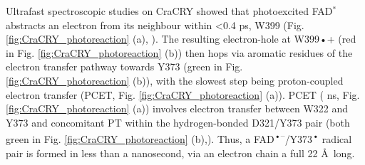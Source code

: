Ultrafast spectroscopic studies on CraCRY showed that photoexcited FAD\(^\ast\) abstracts an electron from its neighbour within <0.4 ps, W399 (Fig. \ref{fig:CraCRY_photoreaction} (a), \cite{lacombatUltrafastOxidationTyrosine2019}). The resulting electron-hole at W399•+ (red in Fig. \ref{fig:CraCRY_photoreaction} (b)) then hops via aromatic residues of the electron transfer pathway towards Y373 (green in Fig. \ref{fig:CraCRY_photoreaction} (b)), with the slowest step being proton-coupled electron transfer (PCET, Fig. \ref{fig:CraCRY_photoreaction} (a)). PCET ( ns, Fig. \ref{fig:CraCRY_photoreaction} (a)) involves electron transfer between W322 and Y373 and concomitant PT within the hydrogen-bonded D321/Y373 pair (both green in Fig. \ref{fig:CraCRY_photoreaction} (b),\cite{lacombatUltrafastOxidationTyrosine2019}).  Thus, a FAD\textsuperscript{•–}/Y373\textsuperscript{•} radical pair is formed in less than a nanosecond, via an electron chain a full 22 \AA\ long. 

